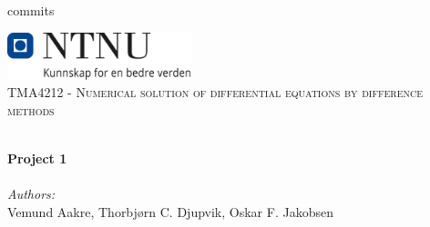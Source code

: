 commits%

\begin{titlepage}
\vbox{ }
\vbox{ }
\begin{center}
\includegraphics[width=0.40\textwidth]{Images/NTNU_logo.png}\\[1cm]
\textsc{\Large TMA4212 - Numerical solution of differential equations by difference methods}\\[0.5cm]
\vbox{ }

\HRule \\[0.4cm]
{ \huge \bfseries Project 1}\\[0.4cm]
\HRule \\[1.5cm]

\large
\emph{Authors:}\\
Vemund Aakre, Thorbjørn C. Djupvik, Oskar F. Jakobsen
\vfill

\end{center}
\end{titlepage}